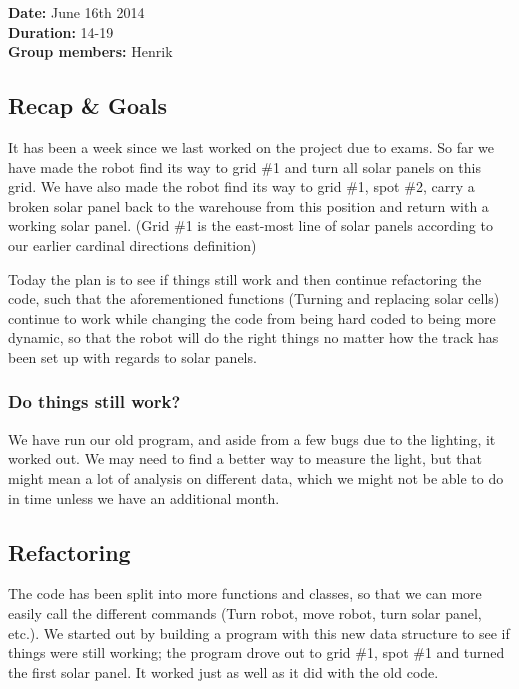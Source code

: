 \textbf{Date:} June 16th 2014\\\textbf{Duration:} 14-19\\\textbf{Group
members:} Henrik

\subsection{Recap \& Goals}

It has been a week since we last worked on the project due to exams. So
far we have made the robot find its way to grid \#1 and turn all solar
panels on this grid. We have also made the robot find its way to grid
\#1, spot \#2, carry a broken solar panel back to the warehouse from
this position and return with a working solar panel. (Grid \#1 is the
east-most line of solar panels according to our earlier cardinal
directions definition)

Today the plan is to see if things still work and then continue
refactoring the code, such that the aforementioned functions (Turning
and replacing solar cells) continue to work while changing the code from
being hard coded to being more dynamic, so that the robot will do the
right things no matter how the track has been set up with regards to
solar panels.

\subsubsection{Do things still work?}

We have run our old program, and aside from a few bugs due to the
lighting, it worked out. We may need to find a better way to measure the
light, but that might mean a lot of analysis on different data, which we
might not be able to do in time unless we have an additional month.

\subsection{Refactoring}

The code has been split into more functions and classes, so that we can
more easily call the different commands (Turn robot, move robot, turn
solar panel, etc.). We started out by building a program with this new
data structure to see if things were still working; the program drove
out to grid \#1, spot \#1 and turned the first solar panel. It worked
just as well as it did with the old code.


